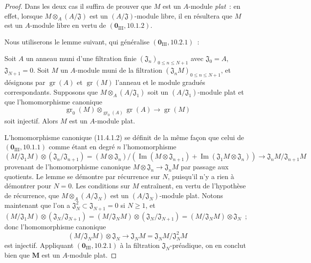 \begin{proof}
Dans les deux cas il suffira de prouver que $M$ est un $A$-module \emph{plat}~:
en effet, lorsque $M\otimes_A(A/\mathfrak J)$ est un
$(A/\mathfrak J)$-module libre, il en résultera que $M$ est un $A$-module libre
en vertu de $(\mathbf 0_{\mathrm{III}},10.1.2)$.

Nous utiliserons le lemme suivant, qui généralise
$(\mathbf 0_{\mathrm{III}},10.2.1)$~:

\begin{lemma}[11.4.1.1]
\label{IV.11.4.1.1-fr}
Soit $A$ un anneau muni d'une filtration finie
$(\mathfrak J_n)_{0\leq n\leq N+1}$ avec $\mathfrak J_0=A$,
$\mathfrak J_{N+1}=0$. Soit $M$ un $A$-module muni de la filtration
$(\mathfrak J_nM)_{0\leq n\leq N+1}$, et désignons par
$\operatorname{gr}(A)$ et $\operatorname{gr}(M)$ l'anneau et le module gradués
correspondants. Supposons que $M\otimes_A(A/\mathfrak J_1)$ soit un
$(A/\mathfrak J_1)$-module plat et que l'homomorphisme canonique
\begin{equation}
\operatorname{gr}_0(M)\otimes_{\operatorname{gr}_0(A)}\operatorname{gr}(A)
\longrightarrow\operatorname{gr}(M)
\label{IV.11.4.1.2-fr}
\tag{11.4.1.2}
\end{equation}
soit injectif. Alors $M$ est un $A$-module plat.
\end{lemma}

L'homomorphisme canonique (11.4.1.2) se définit de la même façon que celui de
$(\mathbf 0_{\mathrm{III}},10.1.1)$ comme étant en degré $n$ l'homomorphisme
\[
(M/\mathfrak J_1M)\otimes(\mathfrak J_n/\mathfrak J_{n+1})
=(M\otimes\mathfrak J_n)/
(\operatorname{Im}(M\otimes\mathfrak J_{n+1})
+\operatorname{Im}(\mathfrak J_1M\otimes\mathfrak J_n))
\longrightarrow\mathfrak J_nM/\mathfrak J_{n+1}M
\]
provenant de l'homomorphisme canonique $M\otimes\mathfrak J_n\to\mathfrak J_nM$
par passage aux quotients. Le lemme se démontre par récurrence sur $N$,
puisqu'il n'y a rien à démontrer pour $N=0$.
Les conditions sur $M$ entraînent, en vertu de l'hypothèse de récurrence, que
$M\otimes_A(A/\mathfrak J_N)$ est un $(A/\mathfrak J_N)$-module plat. Notons
maintenant que l'on a $\mathfrak J_N^2\subset\mathfrak J_{N+1}=0$ si $N\geq1$,
et
$(M/\mathfrak J_1M)\otimes(\mathfrak J_N/\mathfrak J_{N+1})
=(M/\mathfrak J_NM)\otimes(\mathfrak J_N/\mathfrak J_{N+1})
=(M/\mathfrak J_NM)\otimes\mathfrak J_N$~;
donc l'homomorphisme canonique
\[
(M/\mathfrak J_NM)\otimes\mathfrak J_N
\longrightarrow\mathfrak J_NM=\mathfrak J_NM/\mathfrak J_N^2M
\]
est injectif. Appliquant $(\mathbf 0_{\mathrm{III}},10.2.1)$ à la filtration
$\mathfrak J_N$-préadique, on en conclut bien que $\mathbf{M}$ est un $A$-module plat.


\end{proof}
